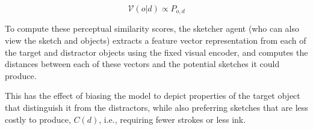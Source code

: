 \documentclass[9pt,twocolumn,twoside]{pnas-new}
\begin{document}
{\begin{equation} \label{literal_viewer_score}
\mathcal{V}(o|d) \propto P_{o,d}
\end{equation}

To compute these perceptual similarity scores, the sketcher agent (who can also view the sketch and objects) extracts a feature vector representation from each of the target and distractor objects using the fixed visual encoder, and computes the distances between each of these vectors and the potential sketches it could produce.

This has the effect of biasing the model to depict properties of the target object that distinguish it from the distractors, while also preferring sketches that are less costly to produce, $C(d)$, i.e., requiring fewer strokes or less ink.

}

\showmatmethods %


\showacknow{} %



\end{document}
